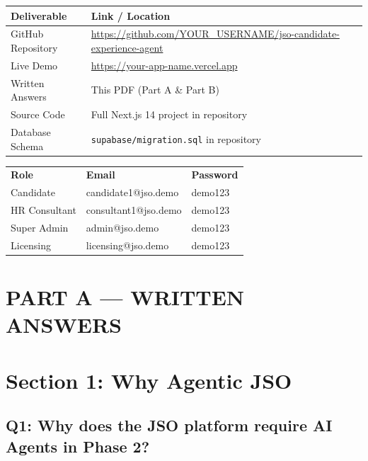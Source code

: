 \documentclass[11pt, a4paper]{article}
\begin{document}
\begin{tabularx}{\textwidth}{l X}
\toprule
\textbf{Deliverable} & \textbf{Link / Location} \\
\midrule
GitHub Repository & \url{https://github.com/YOUR_USERNAME/jso-candidate-experience-agent} \\
Live Demo & \url{https://your-app-name.vercel.app} \\
Written Answers & This PDF (Part A \& Part B) \\
Source Code & Full Next.js 14 project in repository \\
Database Schema & \texttt{supabase/migration.sql} in repository \\
\bottomrule
\end{tabularx}

\begin{tcolorbox}[colback=codebg, colframe=gray!30, boxrule=0.5pt, arc=3pt, title={\small\bfseries Demo Credentials}]
\small
\begin{tabular}{lll}
\textbf{Role} & \textbf{Email} & \textbf{Password} \\
Candidate & candidate1@jso.demo & demo123 \\
HR Consultant & consultant1@jso.demo & demo123 \\
Super Admin & admin@jso.demo & demo123 \\
Licensing & licensing@jso.demo & demo123 \\
\end{tabular}
\end{tcolorbox}

\newpage

\section*{\LARGE PART A — WRITTEN ANSWERS}

\section{Section 1: Why Agentic JSO}

\subsection{Q1: Why does the JSO platform require AI Agents in Phase 2?}
\end{document}
